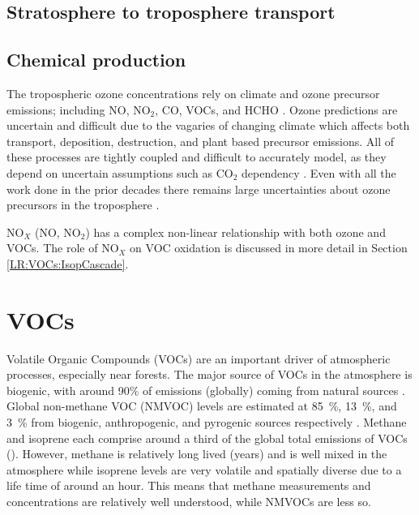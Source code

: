   
  \subsection{Stratosphere to troposphere transport}

  
  \subsection{Chemical production}
    The tropospheric ozone concentrations rely on climate and ozone precursor emissions; including NO, NO$_2$, CO, VOCs, and HCHO \citep{Atkinson2000, Young2013, Marvin2017}. 
    Ozone predictions are uncertain and difficult due to the vagaries of changing climate which affects both transport, deposition, destruction, and plant based precursor emissions.
    All of these processes are tightly coupled and difficult to accurately model, as they depend on uncertain assumptions such as CO$_2$ dependency \citep{Young2013}.
    Even with all the work done in the prior decades there remains large uncertainties about ozone precursors in the troposphere \citep{Mazzuca2016}.
    
    NO$_X$ (NO, NO$_2$) has a complex non-linear relationship with both ozone and VOCs.
    The role of NO$_X$ on VOC oxidation is discussed in more detail in Section \ref{LR:VOCs:IsopCascade}.
    

\section{VOCs}
\label{LR:VOCs}
  Volatile Organic Compounds (VOCs) are an important driver of atmospheric processes, especially near forests.
  The major source of VOCs in the atmosphere is biogenic, with around 90\% of emissions (globally) coming from natural sources \citep{Guenther1995,Guenther2006, Millet2006}.
  Global non-methane VOC (NMVOC) levels are estimated at 85~\%, 13~\%, and 3~\% from biogenic, anthropogenic, and pyrogenic sources respectively \citep{Kefauver2014}.
  Methane and isoprene each comprise around a third of the global total emissions of VOCs (\cite{Guenther2006}).
  However, methane is relatively long lived (years) and is well mixed in the atmosphere while isoprene levels are very volatile and spatially diverse due to a life time of around an hour.
  This means that methane measurements and concentrations are relatively well understood, while NMVOCs are less so.
  
